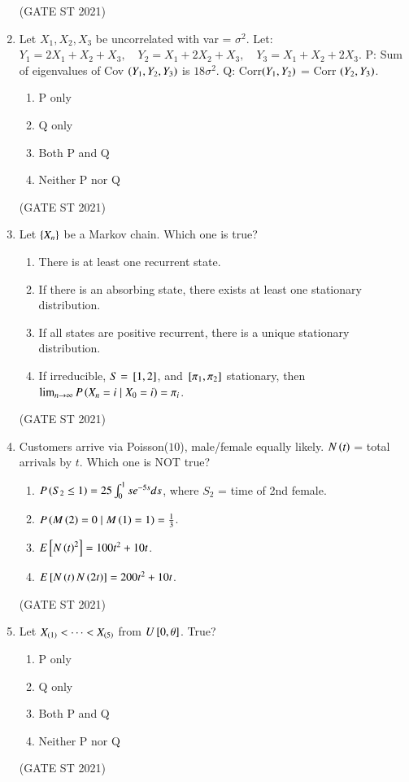 \documentclass[journal,12pt,onecolumn]{IEEEtran}
\theoremstyle{remark}
\begin{document}
\begin{enumerate}
\hfill (GATE ST 2021) \\
\item
Let $X_1, X_2, X_3$ be uncorrelated with var = $\sigma^2$. Let:
$
Y_1 = 2X_1 + X_2 + X_3,\quad Y_2 = X_1 + 2X_2 + X_3,\quad Y_3 = X_1 + X_2 + 2X_3.
$
P: Sum of eigenvalues of Cov $\left(Y_1,Y_2,Y_3\right)$ is $18\sigma^2$.  
Q: Corr$\left(Y_1,Y_2\right)$ = Corr $\left(Y_2,Y_3\right)$.
\begin{enumerate}
\item P only
\item Q only
\item Both P and Q
\item Neither P nor Q
\end{enumerate}

\hfill (GATE ST 2021) \\


\item
Let $\left\{X_n\right\}$ be a Markov chain. Which one is true?
\begin{enumerate}
\item There is at least one recurrent state.
\item If there is an absorbing state, there exists at least one stationary distribution.
\item If all states are positive recurrent, there is a unique stationary distribution.
\item If irreducible, $S = {}\left[1,2\right]$, and ${}\left[\pi_1,\pi_2\right]$ stationary, then $\lim_{n\to\infty} P\left(X_n=i \mid X_0=i\right) = \pi_i$.
\end{enumerate}

\hfill (GATE ST 2021) \\

\item
Customers arrive via Poisson($10$), male/female equally likely. $N\left(t\right)$ = total arrivals by $t$. Which one is NOT true?
\begin{enumerate}
\item $P\left(S_2 \le 1\right) = 25 \int_0^1 s e^{-5s} ds$, where $S_2$ = time of 2nd female.
\item $P\left(M\left(2\right) = 0 \mid M\left(1\right) = 1\right) = \frac13$.
\item $E{}\left[N\left(t\right)^2\right]= 100t^2 + 10t$.
\item $E{}\left[N\left(t\right)N\left(2t\right)\right] = 200t^2 + 10t$.
\end{enumerate}
\hfill (GATE ST 2021) \\

\item
Let $X_{\left(1\right)} < \dots < X_{\left(5\right)}$ from $U{}\left[0,\theta\right]$. True?
\begin{enumerate}
\item P only
\item Q only
\item Both P and Q
\item Neither P nor Q
\end{enumerate}
\hfill (GATE ST 2021) \\


\end{enumerate}
\end{document}

